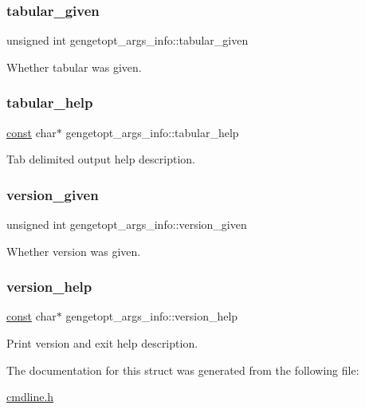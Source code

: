 \subsubsection{\texorpdfstring{tabular\+\_\+given}{tabular\_given}}
{\footnotesize\ttfamily unsigned int gengetopt\+\_\+args\+\_\+info\+::tabular\+\_\+given}



Whether tabular was given. 

\mbox{\label{structgengetopt__args__info_a923b9288287e40df1b3f21bfe288f123}} 
\subsubsection{\texorpdfstring{tabular\+\_\+help}{tabular\_help}}
{\footnotesize\ttfamily \hyperlink{getopt_8c_a2c212835823e3c54a8ab6d95c652660e}{const} char$\ast$ gengetopt\+\_\+args\+\_\+info\+::tabular\+\_\+help}



Tab delimited output help description. 

\mbox{\label{structgengetopt__args__info_ad4953a2130b2f8b94a3a687014f278e1}} 
\subsubsection{\texorpdfstring{version\+\_\+given}{version\_given}}
{\footnotesize\ttfamily unsigned int gengetopt\+\_\+args\+\_\+info\+::version\+\_\+given}



Whether version was given. 

\mbox{\label{structgengetopt__args__info_adef454ea6f3ff4114ae5009e58360cfc}} 
\subsubsection{\texorpdfstring{version\+\_\+help}{version\_help}}
{\footnotesize\ttfamily \hyperlink{getopt_8c_a2c212835823e3c54a8ab6d95c652660e}{const} char$\ast$ gengetopt\+\_\+args\+\_\+info\+::version\+\_\+help}



Print version and exit help description. 



The documentation for this struct was generated from the following file\+:\begin{DoxyCompactItemize}
\item 
\hyperlink{cmdline_8h}{cmdline.\+h}\end{DoxyCompactItemize}
